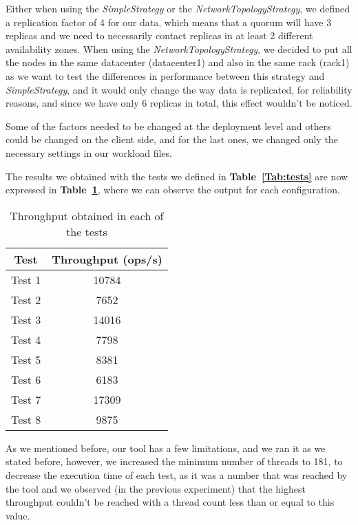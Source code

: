 \documentclass[runningheads]{llncs}
\begin{document}
Either when using the \emph{SimpleStrategy} or the \emph{NetworkTopologyStrategy}, we defined a replication factor of 4 for our data, which means that a quorum will have 3 replicas and we need to necessarily contact replicas in at least 2 different availability zones. When using the \emph{NetworkTopologyStrategy}, we decided to put all the nodes in the same datacenter (datacenter1) and also in the same rack (rack1) as we want to test the differences in performance between this strategy and \emph{SimpleStrategy}, and it would only change the way data is replicated, for reliability reasons, and since we have only 6 replicas in total, this effect wouldn't be noticed.

Some of the factors needed to be changed at the deployment level and others could be changed on the client side, and for the last ones, we changed only the necessary settings in our workload files.

The results we obtained with the tests we defined in \textbf{Table~\ref{Tab:tests}} are now expressed in \textbf{Table~\ref{Tab:throughput}}, where we can observe the output for each configuration.

\begin{table}
  \caption{Throughput obtained in each of the tests}
  \centering
  \begin{tabular}{|c|c|}
    \hline
      Test & Throughput (ops/s) \\
    \hline
      Test 1 & 10784 \\
      Test 2 & 7652  \\
      Test 3 & 14016 \\
      Test 4 & 7798  \\
      Test 5 & 8381  \\
      Test 6 & 6183  \\
      Test 7 & 17309 \\
      Test 8 & 9875  \\
    \hline
  \end{tabular}
  \label{Tab:throughput}
\end{table}

As we mentioned before, our tool has a few limitations, and we ran it as we stated before, however, we increased the minimum number of threads to 181, to decrease the execution time of each test, as it was a number that was reached by the tool and we observed (in the previous experiment) that the highest throughput couldn't be reached with a thread count less than or equal to this value.
\end{document}
